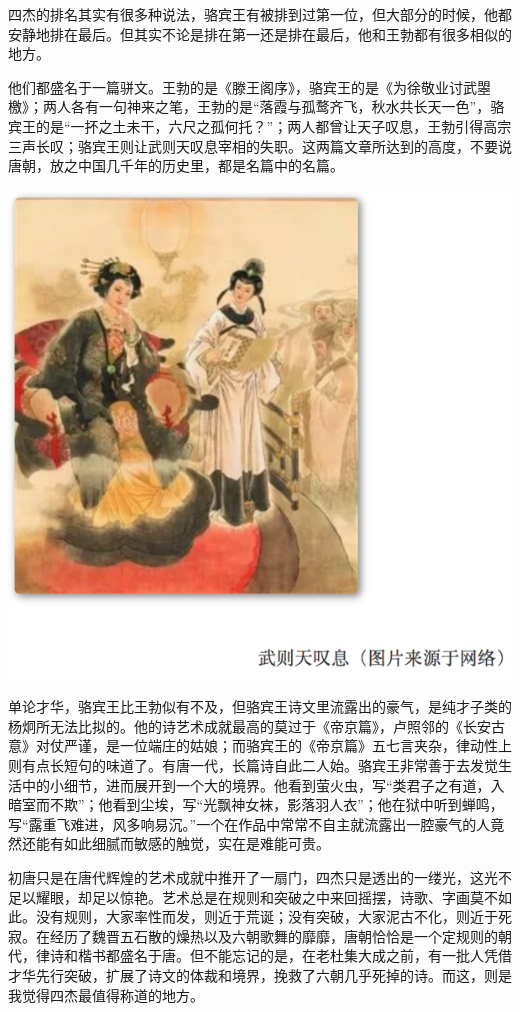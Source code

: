 \documentclass[]{book}
\begin{document}
四杰的排名其实有很多种说法，骆宾王有被排到过第一位，但大部分的时候，他都安静地排在最后。但其实不论是排在第一还是排在最后，他和王勃都有很多相似的地方。

他们都盛名于一篇骈文。王勃的是《滕王阁序》，骆宾王的是《为徐敬业讨武曌檄》；两人各有一句神来之笔，王勃的是``落霞与孤鹜齐飞，秋水共长天一色''，骆宾王的是``一抔之土未干，六尺之孤何托？''；两人都曾让天子叹息，王勃引得高宗三声长叹；骆宾王则让武则天叹息宰相的失职。这两篇文章所达到的高度，不要说唐朝，放之中国几千年的历史里，都是名篇中的名篇。

\includegraphics[width=8.33in]{images/ctsj8}

单论才华，骆宾王比王勃似有不及，但骆宾王诗文里流露出的豪气，是纯才子类的杨炯所无法比拟的。他的诗艺术成就最高的莫过于《帝京篇》，卢照邻的《长安古意》对仗严谨，是一位端庄的姑娘；而骆宾王的《帝京篇》五七言夹杂，律动性上则有点长短句的味道了。有唐一代，长篇诗自此二人始。骆宾王非常善于去发觉生活中的小细节，进而展开到一个大的境界。他看到萤火虫，写``类君子之有道，入暗室而不欺''；他看到尘埃，写``光飘神女袜，影落羽人衣''；他在狱中听到蝉鸣，写``露重飞难进，风多响易沉。''一个在作品中常常不自主就流露出一腔豪气的人竟然还能有如此细腻而敏感的触觉，实在是难能可贵。

初唐只是在唐代辉煌的艺术成就中推开了一扇门，四杰只是透出的一缕光，这光不足以耀眼，却足以惊艳。艺术总是在规则和突破之中来回摇摆，诗歌、字画莫不如此。没有规则，大家率性而发，则近于荒诞；没有突破，大家泥古不化，则近于死寂。在经历了魏晋五石散的燥热以及六朝歌舞的靡靡，唐朝恰恰是一个定规则的朝代，律诗和楷书都盛名于唐。但不能忘记的是，在老杜集大成之前，有一批人凭借才华先行突破，扩展了诗文的体裁和境界，挽救了六朝几乎死掉的诗。而这，则是我觉得四杰最值得称道的地方。
\end{document}
